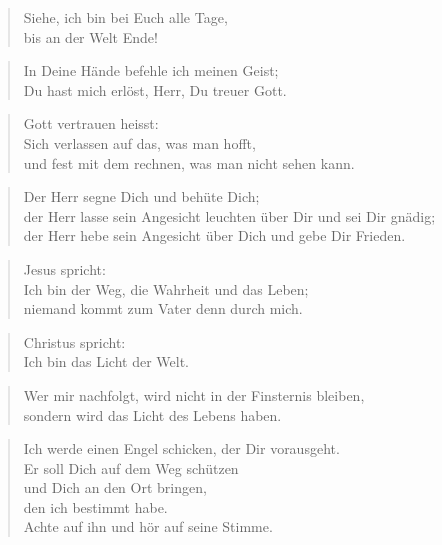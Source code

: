 \documentclass[ngerman,a4paper,11pt]{scrreprt}
\begin{document}
\begin{verse}
Siehe, ich bin bei Euch alle Tage, \\
bis an der Welt Ende! \\
\end{verse}

\begin{verse}
In Deine Hände befehle ich meinen Geist; \\
Du hast mich erlöst, Herr, Du treuer Gott. \\
\end{verse}

\begin{verse}
Gott vertrauen heisst: \\
Sich verlassen auf das, was man hofft, \\
und fest mit dem rechnen, was man nicht sehen kann. \\
\end{verse}

\begin{verse}
Der Herr segne Dich und behüte Dich; \\
der Herr lasse sein Angesicht leuchten über Dir und sei Dir gnädig; \\
der Herr hebe sein Angesicht über Dich und gebe Dir Frieden. \\
\end{verse}

\begin{verse}
Jesus spricht: \\
Ich bin der Weg, die Wahrheit und das Leben; \\
niemand kommt zum Vater denn durch mich. \\
\end{verse}

\begin{verse}
Christus spricht: \\
Ich bin das Licht der Welt. \\
\end{verse}

\begin{verse}
Wer mir nachfolgt, wird nicht in der Finsternis bleiben, \\
sondern wird das Licht des Lebens haben. \\
\end{verse}

\begin{verse}
Ich werde einen Engel schicken, der Dir vorausgeht. \\
Er soll Dich auf dem Weg schützen \\
und Dich an den Ort bringen, \\
den ich bestimmt habe. \\
Achte auf ihn und hör auf seine Stimme. \\
\end{verse}
\end{document}
